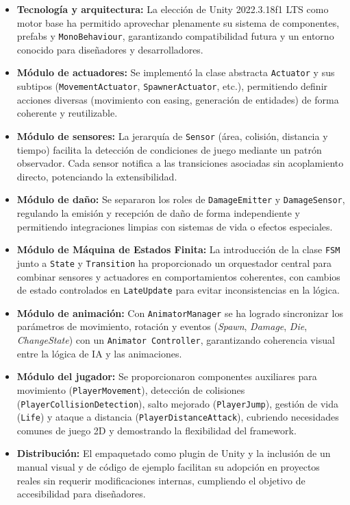 \begin{itemize}
	\item \textbf{Tecnología y arquitectura:} La elección de Unity 2022.3.18f1 LTS como motor base ha permitido aprovechar plenamente su sistema de componentes, prefabs y \texttt{MonoBehaviour}, garantizando compatibilidad futura y un entorno conocido para diseñadores y desarrolladores.
	\item \textbf{Módulo de actuadores:} Se implementó la clase abstracta \texttt{Actuator} y sus subtipos (\texttt{MovementActuator}, \texttt{SpawnerActuator}, etc.), permitiendo definir acciones diversas (movimiento con easing, generación de entidades) de forma coherente y reutilizable.
	\item \textbf{Módulo de sensores:} La jerarquía de \texttt{Sensor} (área, colisión, distancia y tiempo) facilita la detección de condiciones de juego mediante un patrón observador. Cada sensor notifica a las transiciones asociadas sin acoplamiento directo, potenciando la extensibilidad.
	\item \textbf{Módulo de daño:} Se separaron los roles de \texttt{DamageEmitter} y \texttt{DamageSensor}, regulando la emisión y recepción de daño de forma independiente y permitiendo integraciones limpias con sistemas de vida o efectos especiales.
	\item \textbf{Módulo de Máquina de Estados Finita:} La introducción de la clase \texttt{FSM} junto a \texttt{State} y \texttt{Transition} ha proporcionado un orquestador central para combinar sensores y actuadores en comportamientos coherentes, con cambios de estado controlados en \texttt{LateUpdate} para evitar inconsistencias en la lógica.
	\item \textbf{Módulo de animación:} Con \texttt{AnimatorManager} se ha logrado sincronizar los parámetros de movimiento, rotación y eventos (\textit{Spawn}, \textit{Damage}, \textit{Die}, \textit{ChangeState}) con un \texttt{Animator Controller}, garantizando coherencia visual entre la lógica de IA y las animaciones.
	\item \textbf{Módulo del jugador:} Se proporcionaron componentes auxiliares para movimiento (\texttt{PlayerMovement}), detección de colisiones (\texttt{PlayerCollisionDetection}), salto mejorado (\texttt{PlayerJump}), gestión de vida (\texttt{Life}) y ataque a distancia (\texttt{PlayerDistanceAttack}), cubriendo necesidades comunes de juego 2D y demostrando la flexibilidad del framework.
	\item \textbf{Distribución:} El empaquetado como plugin de Unity y la inclusión de un manual visual y de código de ejemplo facilitan su adopción en proyectos reales sin requerir modificaciones internas, cumpliendo el objetivo de accesibilidad para diseñadores.
\end{itemize}

